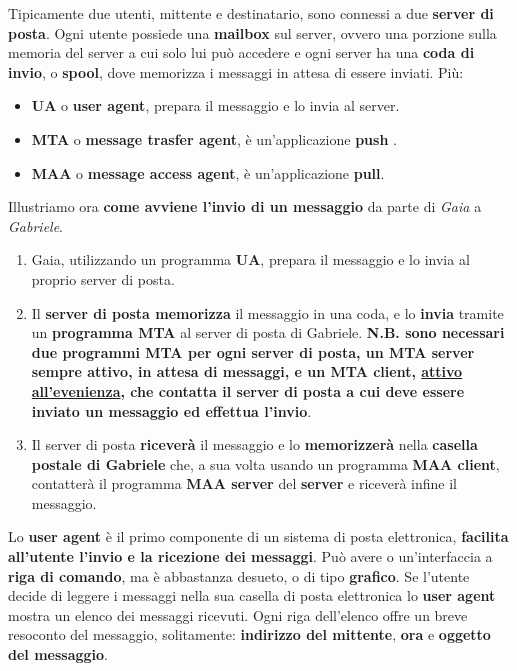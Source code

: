 \documentclass[11pt,a4paper]{article}
\theoremstyle{definition}
\begin{document}
Tipicamente due utenti, mittente e destinatario, sono connessi a due \textbf{server di posta}. Ogni utente possiede una \textbf{mailbox} sul server, ovvero una porzione sulla memoria del server a cui solo lui può accedere e ogni server ha una \textbf{coda di invio}, o \textbf{spool}, dove memorizza i messaggi in attesa di essere inviati. Più:
\begin{itemize}
	\item \textbf{UA} o  \textbf{user agent}, prepara il messaggio e lo invia al server.
	\item \textbf{MTA} o \textbf{message trasfer agent}, è un'applicazione \textbf{push} .
	\item \textbf{MAA} o \textbf{message access agent}, è un'applicazione \textbf{pull}.
\end{itemize}
\newpage
Illustriamo ora \textbf{come avviene l'invio di un messaggio} da parte di \textit{Gaia} a \textit{Gabriele}.
\begin{enumerate}
	\item Gaia, utilizzando un programma \textbf{UA}, prepara il messaggio e lo invia al proprio server di posta.
	\item Il \textbf{server di posta memorizza} il messaggio in una coda, e lo \textbf{invia} tramite un \textbf{programma MTA} al server di posta di Gabriele.\textbf{ N.B. sono necessari due programmi MTA per ogni server di posta, un MTA server sempre attivo, in attesa di messaggi, e un MTA client, \underline{attivo all'evenienza}, che contatta il server di posta a cui deve essere inviato un messaggio  ed effettua l'invio}.
	\item Il server di posta \textbf{riceverà} il messaggio e lo \textbf{memorizzerà} nella \textbf{casella postale di Gabriele} che, a sua volta usando un programma \textbf{MAA client}, contatterà il programma \textbf{MAA server} del \textbf{server} e riceverà infine il messaggio.
\end{enumerate}
Lo \textbf{user agent} è il primo componente di un sistema di posta elettronica, \textbf{facilita all'utente l'invio e la ricezione dei messaggi}. Può avere o un'interfaccia a \textbf{riga di comando}, ma è abbastanza desueto, o di tipo \textbf{grafico}. Se l'utente decide di leggere i messaggi nella sua casella di posta elettronica lo \textbf{user agent} mostra un elenco dei messaggi ricevuti. Ogni riga dell'elenco offre un breve resoconto del messaggio, solitamente: \textbf{indirizzo del mittente}, \textbf{ora} e \textbf{oggetto del messaggio}.\newline\newline
\end{document}
